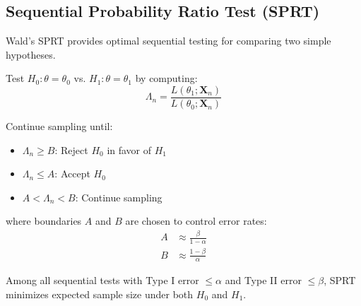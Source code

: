\subsection{Sequential Probability Ratio Test (SPRT)}

Wald's SPRT provides optimal sequential testing for comparing two simple hypotheses.

\begin{definition}[SPRT]
Test $H_0: \theta = \theta_0$ vs. $H_1: \theta = \theta_1$ by computing:
\begin{equation}
\Lambda_n = \frac{L(\theta_1; \mathbf{X}_n)}{L(\theta_0; \mathbf{X}_n)}
\end{equation}

Continue sampling until:
\begin{itemize}
    \item $\Lambda_n \geq B$: Reject $H_0$ in favor of $H_1$
    \item $\Lambda_n \leq A$: Accept $H_0$
    \item $A < \Lambda_n < B$: Continue sampling
\end{itemize}

where boundaries $A$ and $B$ are chosen to control error rates:
\begin{align}
A &\approx \frac{\beta}{1-\alpha} \\
B &\approx \frac{1-\beta}{\alpha}
\end{align}
\end{definition}

\begin{theorem}[Wald, 1947]
Among all sequential tests with Type I error $\leq \alpha$ and Type II error $\leq \beta$, SPRT minimizes expected sample size under both $H_0$ and $H_1$.
\end{theorem}

